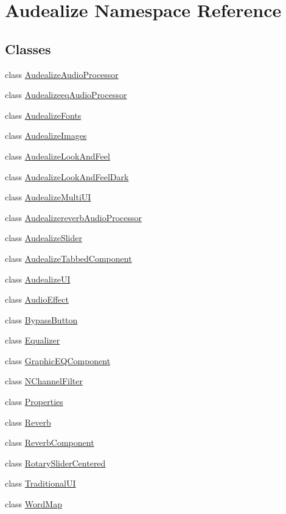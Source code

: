 \hypertarget{namespace_audealize}{}\section{Audealize Namespace Reference}
\label{namespace_audealize}
\subsection*{Classes}
\begin{DoxyCompactItemize}
\item 
class \hyperlink{class_audealize_1_1_audealize_audio_processor}{Audealize\+Audio\+Processor}
\item 
class \hyperlink{class_audealize_1_1_audealizeeq_audio_processor}{Audealizeeq\+Audio\+Processor}
\item 
class \hyperlink{class_audealize_1_1_audealize_fonts}{Audealize\+Fonts}
\item 
class \hyperlink{class_audealize_1_1_audealize_images}{Audealize\+Images}
\item 
class \hyperlink{class_audealize_1_1_audealize_look_and_feel}{Audealize\+Look\+And\+Feel}
\item 
class \hyperlink{class_audealize_1_1_audealize_look_and_feel_dark}{Audealize\+Look\+And\+Feel\+Dark}
\item 
class \hyperlink{class_audealize_1_1_audealize_multi_u_i}{Audealize\+Multi\+UI}
\item 
class \hyperlink{class_audealize_1_1_audealizereverb_audio_processor}{Audealizereverb\+Audio\+Processor}
\item 
class \hyperlink{class_audealize_1_1_audealize_slider}{Audealize\+Slider}
\item 
class \hyperlink{class_audealize_1_1_audealize_tabbed_component}{Audealize\+Tabbed\+Component}
\item 
class \hyperlink{class_audealize_1_1_audealize_u_i}{Audealize\+UI}
\item 
class \hyperlink{class_audealize_1_1_audio_effect}{Audio\+Effect}
\item 
class \hyperlink{class_audealize_1_1_bypass_button}{Bypass\+Button}
\item 
class \hyperlink{class_audealize_1_1_equalizer}{Equalizer}
\item 
class \hyperlink{class_audealize_1_1_graphic_e_q_component}{Graphic\+E\+Q\+Component}
\item 
class \hyperlink{class_audealize_1_1_n_channel_filter}{N\+Channel\+Filter}
\item 
class \hyperlink{class_audealize_1_1_properties}{Properties}
\item 
class \hyperlink{class_audealize_1_1_reverb}{Reverb}
\item 
class \hyperlink{class_audealize_1_1_reverb_component}{Reverb\+Component}
\item 
class \hyperlink{class_audealize_1_1_rotary_slider_centered}{Rotary\+Slider\+Centered}
\item 
class \hyperlink{class_audealize_1_1_traditional_u_i}{Traditional\+UI}
\item 
class \hyperlink{class_audealize_1_1_word_map}{Word\+Map}
\end{DoxyCompactItemize}
